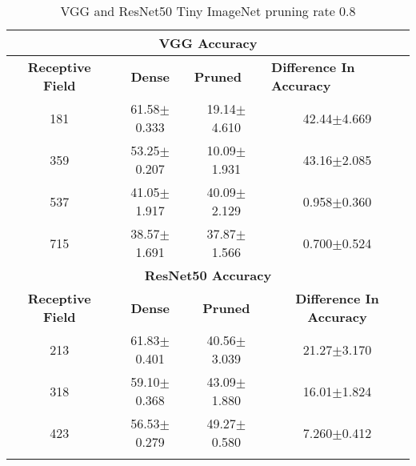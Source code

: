 \begin{table}[H]
  \centering
\begin{tabular}{@{}cccc@{}}
\toprule
\multicolumn{4}{c}{\textbf{VGG Accuracy}}                                                                                                                                  \\ \midrule
\textbf{Receptive Field} & \textbf{Dense} & \multicolumn{1}{l}{\textbf{Pruned}} & \multicolumn{1}{l}{\textbf{Difference In Accuracy}} \\ \midrule
181                      & 61.58$\pm$0.333              & 19.14$\pm$4.610                                   & 42.44$\pm$4.669                                     \\
359                      & 53.25$\pm$0.207              & 10.09$\pm$1.931                                   & 43.16$\pm$2.085                                     \\
537                      & 41.05$\pm$1.917              & 40.09$\pm$2.129                                   & 0.958$\pm$0.360                                     \\
715                      & 38.57$\pm$1.691              & 37.87$\pm$1.566                                   & 0.700$\pm$0.524                                     \\ \midrule
\multicolumn{4}{c}{\textbf{ResNet50 Accuracy}}                                                                                                                             \\ \midrule
\textbf{Receptive Field} & \textbf{Dense} & \textbf{Pruned}                     & \textbf{Difference In Accuracy}                     \\
213                      & 61.83$\pm$0.401              & 40.56$\pm$3.039                                   & 21.27$\pm$3.170                                     \\
318                      & 59.10$\pm$0.368              & 43.09$\pm$1.880                                   & 16.01$\pm$1.824                                     \\
423                      & 56.53$\pm$0.279              & 49.27$\pm$0.580                                   &
7.260$\pm$0.412                                     \\ \bottomrule \\
\end{tabular}
\caption{VGG and ResNet50 Tiny ImageNet pruning rate 0.8}
\label{tab:tiny imagenet pruning rate08}
\end{table}


